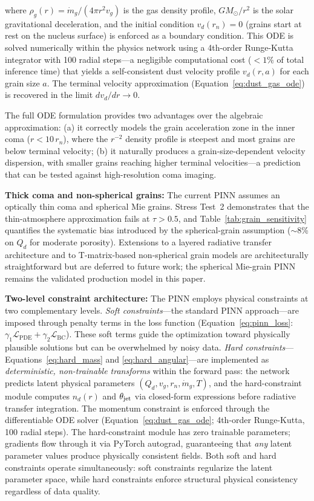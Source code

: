 \documentclass[usenatbib]{mnras}
\begin{document}
where $\rho_g(r) = \dot{m}_g / (4\pi r^2 v_g)$ is the gas density profile, $G M_{\odot}/r^2$ is the solar gravitational deceleration, and the initial condition $v_d(r_n) = 0$ (grains start at rest on the nucleus surface) is enforced as a boundary condition. This ODE is solved numerically within the physics network using a 4th-order Runge-Kutta integrator with 100 radial steps---a negligible computational cost ($<1$\% of total inference time) that yields a self-consistent dust velocity profile $v_d(r, a)$ for each grain size $a$. The terminal velocity approximation (Equation~\ref{eq:dust_gas_ode}) is recovered in the limit $d v_d / d r \rightarrow 0$.

The full ODE formulation provides two advantages over the algebraic approximation: (a) it correctly models the grain acceleration zone in the inner coma ($r < 10\,r_n$), where the $r^{-2}$ density profile is steepest and most grains are below terminal velocity; (b) it naturally produces a grain-size-dependent velocity dispersion, with smaller grains reaching higher terminal velocities---a prediction that can be tested against high-resolution coma imaging.

\textbf{Thick coma and non-spherical grains:} The current PINN assumes an optically thin coma and spherical Mie grains. Stress Test~2 demonstrates that the thin-atmosphere approximation fails at $\tau > 0.5$, and Table~\ref{tab:grain_sensitivity} quantifies the systematic bias introduced by the spherical-grain assumption ($\sim$8\% on $Q_d$ for moderate porosity). Extensions to a layered radiative transfer architecture and to T-matrix-based non-spherical grain models are architecturally straightforward but are deferred to future work; the spherical Mie-grain PINN remains the validated production model in this paper.

\textbf{Two-level constraint architecture:} The PINN employs physical constraints at two complementary levels. \textit{Soft constraints}---the standard PINN approach---are imposed through penalty terms in the loss function (Equation~\ref{eq:pinn_loss}: $\gamma_1 \mathcal{L}_{\text{PDE}} + \gamma_2 \mathcal{L}_{\text{BC}}$). These soft terms guide the optimization toward physically plausible solutions but can be overwhelmed by noisy data. \textit{Hard constraints}---Equations~\ref{eq:hard_mass} and \ref{eq:hard_angular}---are implemented as \textit{deterministic, non-trainable transforms} within the forward pass: the network predicts latent physical parameters $(Q_d, v_g, r_n, \dot{m}_g, T)$, and the hard-constraint module computes $n_d(r)$ and $\theta_{\rm jet}$ via closed-form expressions before radiative transfer integration. The momentum constraint is enforced through the differentiable ODE solver (Equation~\ref{eq:dust_gas_ode}; 4th-order Runge-Kutta, 100 radial steps). The hard-constraint module has zero trainable parameters; gradients flow through it via PyTorch autograd, guaranteeing that \textit{any} latent parameter values produce physically consistent fields. Both soft and hard constraints operate simultaneously: soft constraints regularize the latent parameter space, while hard constraints enforce structural physical consistency regardless of data quality.
\end{document}
